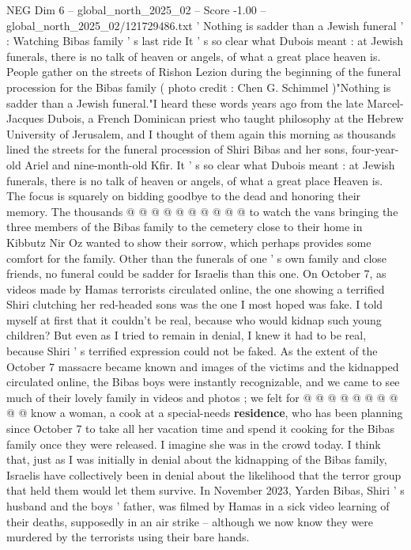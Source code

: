\begin{textsample}{NEG Dim 6 – global\_north\_2025\_02 – Score -1.00 – global\_north\_2025\_02/121729486.txt}  \label{ex:f6_neg_107}
' Nothing is sadder than a Jewish funeral ' : Watching Bibas family ' s last ride It ' s so clear what Dubois meant : at Jewish funerals, there is no talk of heaven or angels, of what a great place heaven is.
People gather on the streets of Rishon Lezion during the beginning of the funeral procession for the Bibas family ( photo credit : Chen G.
Schimmel )"Nothing is sadder than a Jewish funeral."I heard these words years ago from the late Marcel-Jacques Dubois, a French Dominican priest who taught philosophy at the Hebrew University of Jerusalem, and I thought of them again this morning as thousands lined the streets for the funeral procession of Shiri Bibas and her sons, four-year-old Ariel and nine-month-old Kfir.
It ' s so clear what Dubois meant : at Jewish funerals, there is no talk of heaven or angels, of what a great place Heaven is.
The focus is squarely on bidding goodbye to the dead and honoring their memory.
The thousands @ @ @ @ @ @ @ @ @ @ to watch the vans bringing the three members of the Bibas family to the cemetery close to their home in Kibbutz Nir Oz wanted to show their sorrow, which perhaps provides some comfort for the family.
Other than the funerals of one ' s own family and close friends, no funeral could be sadder for Israelis than this one.
On October 7, as videos made by Hamas terrorists circulated online, the one showing a terrified Shiri clutching her red-headed sons was the one I most hoped was fake.
I told myself at first that it couldn't be real, because who would kidnap such young children?
But even as I tried to remain in denial, I knew it had to be real, because Shiri ' s terrified expression could not be faked.
As the extent of the October 7 massacre became known and images of the victims and the kidnapped circulated online, the Bibas boys were instantly recognizable, and we came to see much of their lovely family in videos and photos ; we felt for @ @ @ @ @ @ @ @ @ @ know a woman, a cook at a special-needs \textbf{residence}, who has been planning since October 7 to take all her vacation time and spend it cooking for the Bibas family once they were released.
I imagine she was in the crowd today.
I think that, just as I was initially in denial about the kidnapping of the Bibas family, Israelis have collectively been in denial about the likelihood that the terror group that held them would let them survive.
In November 2023, Yarden Bibas, Shiri ' s husband and the boys ' father, was filmed by Hamas in a sick video learning of their deaths, supposedly in an air strike -- although we now know they were murdered by the terrorists using their bare hands.

\end{textsample}
